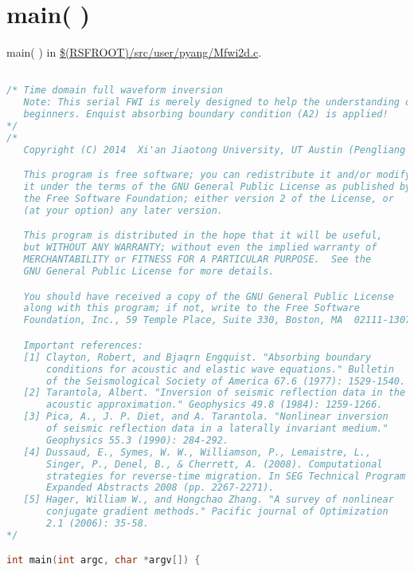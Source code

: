\documentclass[a4paper,11pt]{article}
\theoremstyle{mytheor}
\begin{document}
\section*{main( )}
main( ) in \url{$(RSFROOT)/src/user/pyang/Mfwi2d.c}.
\begin{lstlisting}[label={main},language=C,tabsize=4,caption=main()]

/* Time domain full waveform inversion 
   Note: This serial FWI is merely designed to help the understanding of 
   beginners. Enquist absorbing boundary condition (A2) is applied!
*/
/*
   Copyright (C) 2014  Xi'an Jiaotong University, UT Austin (Pengliang Yang)

   This program is free software; you can redistribute it and/or modify
   it under the terms of the GNU General Public License as published by
   the Free Software Foundation; either version 2 of the License, or
   (at your option) any later version.

   This program is distributed in the hope that it will be useful,
   but WITHOUT ANY WARRANTY; without even the implied warranty of
   MERCHANTABILITY or FITNESS FOR A PARTICULAR PURPOSE.  See the
   GNU General Public License for more details.

   You should have received a copy of the GNU General Public License
   along with this program; if not, write to the Free Software
   Foundation, Inc., 59 Temple Place, Suite 330, Boston, MA  02111-1307  USA

   Important references:
   [1] Clayton, Robert, and Bjaqrn Engquist. "Absorbing boundary 
	   conditions for acoustic and elastic wave equations." Bulletin 
	   of the Seismological Society of America 67.6 (1977): 1529-1540.
   [2] Tarantola, Albert. "Inversion of seismic reflection data in the 
       acoustic approximation." Geophysics 49.8 (1984): 1259-1266.
   [3] Pica, A., J. P. Diet, and A. Tarantola. "Nonlinear inversion 
       of seismic reflection data in a laterally invariant medium." 
       Geophysics 55.3 (1990): 284-292.
   [4] Dussaud, E., Symes, W. W., Williamson, P., Lemaistre, L., 
       Singer, P., Denel, B., & Cherrett, A. (2008). Computational 
       strategies for reverse-time migration. In SEG Technical Program 
       Expanded Abstracts 2008 (pp. 2267-2271).
   [5] Hager, William W., and Hongchao Zhang. "A survey of nonlinear
       conjugate gradient methods." Pacific journal of Optimization 
       2.1 (2006): 35-58.
*/

int main(int argc, char *argv[]) {
	

\end{lstlisting}
\end{document}
